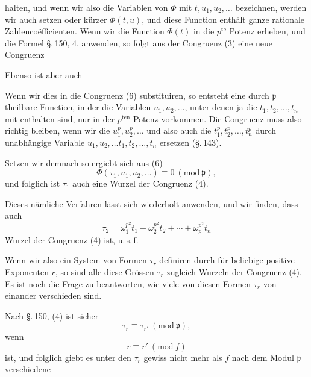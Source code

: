 halten, und wenn wir also die Variablen von $\Phi$ mit $t, u_1, u_2,
\ldots$ bezeichnen, werden wir auch setzen
oder kürzer $\Phi(t, u)$, und diese Function enthält ganze rationale
Zahlencoëfficienten. Wenn wir die Function $\Phi(t)$ in die
$p^{\text{te}}$ Potenz erheben, und die Formel \S.\,150, 4. anwenden,
so folgt aus der Congruenz (3) eine neue Congruenz

Ebenso ist aber auch

Wenn wir dies in die Congruenz (6) substituiren, so entsteht eine
durch $\mathfrak p$ theilbare Function, in der die Variablen
$u_1, u_2, \ldots$, unter denen ja die $t_1, t_2, \ldots, t_n$ mit
enthalten sind, nur in der $p^{\text{ten}}$ Potenz vorkommen. Die
Congruenz muss also richtig bleiben, wenn wir die $u_1^p, u_2^p,
\ldots$ und also auch die $t_1^p, t_2^p, \ldots, t_n^p$ durch
unabhängige Variable $u_1, u_2, \ldots t_1, t_2, \ldots, t_n$ ersetzen
(\S.\,143).

Setzen wir demnach
so ergiebt sich aus (6)
\[
\Phi(\tau_1, u_1, u_2, \ldots) \equiv 0\ (\mathrm{mod}\ \mathfrak p),
\]
und folglich ist $\tau_1$ auch eine Wurzel der Congruenz (4).

Dieses nämliche Verfahren lässt sich wiederholt anwenden, und wir
finden, dass auch
\[
\tau_2 = \omega_1^{p^2} t_1 + \omega_2^{p^2} t_2 + \cdots + \omega_p^{p^2} t_n %
\]
Wurzel der Congruenz (4) ist, u.\,s.\,f.

Wenn wir also ein System von
Formen $\tau_r$ definiren durch
für beliebige positive Exponenten $r$, so sind alle diese Grössen
$\tau_r$ zugleich Wurzeln der Congruenz (4). Es ist noch die Frage zu
beantworten, wie viele von diesen Formen $\tau_r$ von einander
verschieden sind.

Nach \S.\,150, (4) ist sicher
\[
\tau_r \equiv \tau_{r'}\ (\mathrm{mod}\ \mathfrak p),
\]
wenn
\[
r \equiv r'\ (\mathrm{mod}\ f)
\]
ist, und folglich giebt es unter den $\tau_r$ gewiss nicht mehr als
$f$ nach dem Modul $\mathfrak p$ verschiedene
